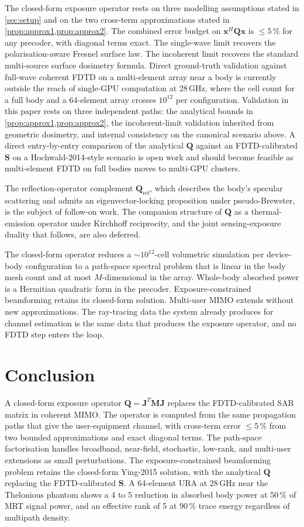 \documentclass[journal,twocolumn,10pt]{IEEEtran}
\theoremstyle{plain}
\theoremstyle{remark}
\newcommand{\xx}{\mathbf{x}}
\newcommand{\Qmat}{\mathbf{Q}}
\newcommand{\Mmat}{\mathbf{M}}
\newcommand{\Jmat}{\mathbf{J}}
\begin{document}
The closed-form exposure operator rests on three modelling
assumptions stated in \cref{sec:setup} and on the two cross-term
approximations stated in \cref{prop:approx1,prop:approx2}. The
combined error budget on $\xx^H \Qmat \xx$ is $\leq 5\,\%$ for any
precoder, with diagonal terms exact. The single-wave limit recovers
the polarisation-aware Fresnel surface law. The incoherent limit
recovers the standard multi-source surface dosimetry formula. Direct ground-truth
validation against full-wave coherent FDTD on a multi-element array
near a body is currently outside the reach of single-GPU
computation at 28\,GHz, where the cell count for a full body and a
64-element array crosses $10^{12}$ per configuration. Validation in
this paper rests on three independent paths: the analytical bounds
in \cref{prop:approx1,prop:approx2}, the incoherent-limit validation
inherited from geometric dosimetry, and internal consistency on the
canonical scenario above. A direct entry-by-entry comparison of the
analytical $\Qmat$ against an FDTD-calibrated $\mathbf{S}$ on a
Hochwald-2014-style scenario is open work and should become feasible
as multi-element FDTD on full bodies moves to multi-GPU clusters.

The reflection-operator complement $\Qmat_{\mathrm{ref}}$, which
describes the body's specular scattering and admits an
eigenvector-locking proposition under pseudo-Brewster, is the
subject of follow-on work. The companion structure of $\Qmat$ as a
thermal-emission operator under Kirchhoff reciprocity, and the
joint sensing-exposure duality that follows, are also deferred.

The closed-form operator reduces a $\sim 10^{12}$-cell volumetric
simulation per device-body configuration to a path-space spectral
problem that
is linear in the body mesh count and at most $M$-dimensional in the
array. Whole-body absorbed power is a Hermitian quadratic form in
the precoder. Exposure-constrained beamforming retains its
closed-form solution. Multi-user MIMO extends without new
approximations. The ray-tracing data the system already produces
for channel estimation is the same data that produces the exposure
operator, and no FDTD step enters the loop.


\section{Conclusion}\label{sec:concl}

A closed-form exposure operator $\Qmat = \Jmat^T \Mmat \Jmat$
replaces the FDTD-calibrated SAR matrix in coherent MIMO. The
operator is computed from the same propagation paths that give the
user-equipment channel, with cross-term error $\leq 5\,\%$ from two
bounded approximations and exact diagonal terms. The path-space
factorisation handles broadband, near-field, stochastic, low-rank,
and multi-user extensions as small perturbations. The
exposure-constrained beamforming problem retains the closed-form
Ying-2015 solution, with the analytical $\Qmat$ replacing the
FDTD-calibrated $\mathbf{S}$. A 64-element URA at 28\,GHz near the
Thelonious phantom shows a 4 to 5 reduction in absorbed body power
at 50\,\% of MRT signal power, and an effective rank of 5 at
90\,\% trace energy regardless of multipath density.




\end{document}
